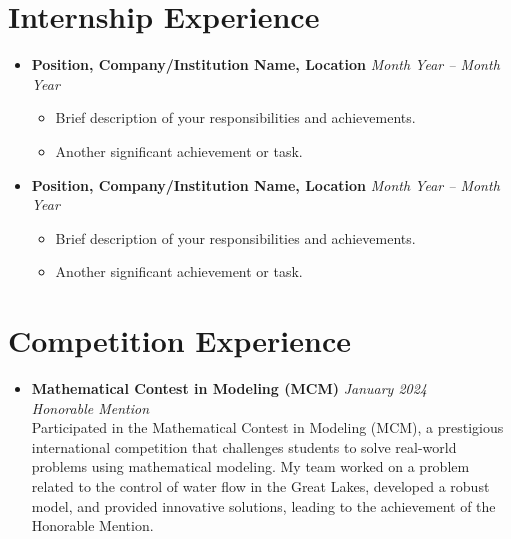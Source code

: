 \documentclass[a4paper,10pt]{article}
\begin{document}
\section*{Internship Experience}
\begin{itemize}[leftmargin=0.5cm]
    \item \textbf{Position, Company/Institution Name, Location} \hfill \textit{Month Year -- Month Year} 
    
    \begin{itemize}
        \item Brief description of your responsibilities and achievements.
        \item Another significant achievement or task.
    \end{itemize}
    
    \item \textbf{Position, Company/Institution Name, Location} \hfill \textit{Month Year -- Month Year}
    
    \begin{itemize}
        \item Brief description of your responsibilities and achievements.
        \item Another significant achievement or task.
    \end{itemize}
\end{itemize}

\section*{Competition Experience}
\begin{itemize}[leftmargin=0.5cm]
    \item \textbf{Mathematical Contest in Modeling (MCM)} \hfill \textit{January 2024} \\
    \textit{Honorable Mention} \\
    Participated in the Mathematical Contest in Modeling (MCM), 
    a prestigious international competition that challenges students to solve real-world problems using mathematical modeling. 
    My team worked on a problem related to the control of water flow in the Great Lakes, developed a robust model, and provided innovative solutions, 
    leading to the achievement of the Honorable Mention.
\end{itemize}
\end{document}

